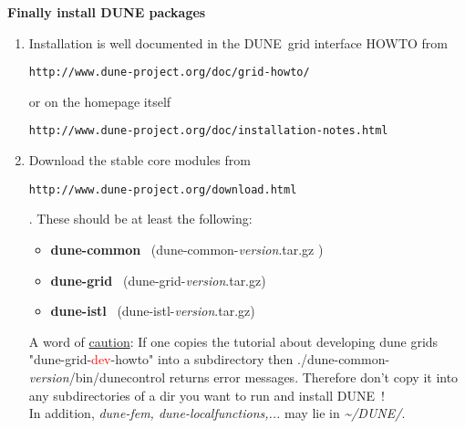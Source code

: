 \documentclass[a4paper,12pt]{article}
\newcommand{\dune}{\textsc{DUNE}\ }
\newcommand{\dyeitred}{\textcolor{red}}{}
\begin{document}
\medskip
\begin{center}
 \large {\textbf{\textsf{Finally install DUNE packages}}}
\end{center}

\begin{enumerate}
  \item Installation is well documented in the \dune grid interface HOWTO from
    \begin{center} \texttt{http://www.dune-project.org/doc/grid-howto/}\end{center} or
    on the homepage itself
    \begin{center}
      \texttt{http://www.dune-project.org/doc/installation-notes.html}
    \end{center}
  \item Download the stable core modules from 
  \begin{center}
      \texttt{http://www.dune-project.org/download.html}
    \end{center}.
  These should be at least the following:
\begin{itemize}
  \item \textbf{dune-common} \ (dune-common-\textit{version}.tar.gz )
  \item \textbf{dune-grid}   \ (dune-grid-\textit{version}.tar.gz)
  \item \textbf{dune-istl} \ (dune-istl-\textit{version}.tar.gz)
\end{itemize}
A word of \underline{caution}: If one copies the tutorial about developing dune grids "dune-grid-\dyeitred{dev}-howto" into a subdirectory then ./dune-common-\textit{version}/bin/dunecontrol returns error messages. Therefore don't copy it into any subdirectories of a dir you want to run and install \dune!\\
In addition, \textit{dune-fem, dune-localfunctions,...} may lie in \textit{\textasciitilde /DUNE/}.


\end{enumerate}
\end{document}
